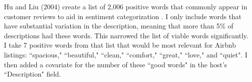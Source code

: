 Hu and Liu (2004) create a list of 2,006 positive words that commonly appear in customer reviews to aid in sentiment categorization \citep{hu}. I only include words that have substantial variation in the description, meaning that more than 5\% of descriptions had these words. This narrowed the list of viable words significantly. I take 7 positive words from that list that would be most relevant for Airbnb listings: ``spacious," ``beautiful," ``clean," ``comfort," ``great," ``love," and ``quiet". I then added a covariate for the number of these ``good words" in the host's ``Description" field.


\newpage	


